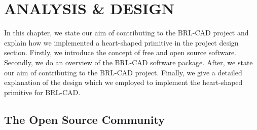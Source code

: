 \chapter{ANALYSIS \& DESIGN}
\label{Analysis \& Design}

\hspace{30} In this chapter,   we   state   our   aim   of   contributing   to   the   BRL-­CAD   project  
and   explain   how   we   implemented   a   heart-shaped   primitive   in   the   project   design  
section.   Firstly,   we   introduce   the   concept   of   free   and   open   source   software. Secondly,   we   do   an   overview   of   the   BRL-­CAD   software   package.   After,   we  state   our   aim   of   contributing   to   the   BRL-­CAD   project.   Finally,   we   give   a   detailed  explanation   of   the   design   which   we   employed   to   implement   the   heart-­shaped primitive for BRL-CAD.

\section{The Open Source Community}


